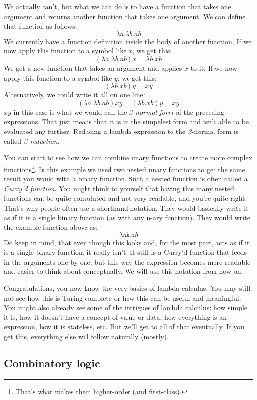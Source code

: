 \documentclass[11pt]{article}
\begin{document}
We actually can't, but what we can do is to have a function that takes one
argument and returns another function that takes one argument. We can define
that function as follows:
\[\lambda a.\lambda b.ab\]
We currently have a function definition inside the body of another function. If
we now apply this function to a symbol like \(x\), we get this:
\[(\lambda a.\lambda b.ab)x=\lambda b.xb\]
We get a new function that takes an argument and applies \(x\) to it. If we now
apply this function to a symbol like \(y\), we get this:
\[(\lambda b.xb)y=xy\]
Alternatively, we could write it all on one line:
\[(\lambda a.\lambda b.ab)xy=(\lambda b.xb)y=xy\]
\(xy\) in this case is what we would call the \emph{\(\beta\)-normal form} of
the preceding expressions. That just means that it is in the simpelest form and
isn't able to be evaluated any further. Reducing a lambda expression to the
\(\beta\)-normal form is called \emph{\(\beta\)-reduction}.

You can start to see how we can combine unary functions to create more complex
functions\footnote{That's what makes them higher-order (and first-class).}. In
this example we used two nested unary functions to get the same result you
would with a binary function. Such a nested function is often called a
\emph{Curry'd function}.
You might think to yourself that having this many nested functions can be quite
convoluted and not very readable, and you're quite right. That's why people
often use a shorthand notation. They would basically write it as if it is a
single binary function (as with any n-ary function). They would write the
example function above as:
\[\lambda ab.ab\]
Do keep in mind, that even though this looks and, for the most part, acts as if
it is a single binary function, it really isn't. It still is a Curry'd function
that feeds in the arguments one by one, but this way the expression becomes
more readable and easier to think about conceptually. We will use this notation
from now on.

Congratulations, you now know the very basics of lambda calculus. You may still
not see how this is Turing complete or how this can be useful and meaningful.
You might also already see some of the intrigues of lambda calculus; how simple
it is, how it doesn't have a concept of value or data, how everything is an
expression, how it is stateless, etc. But we'll get to all of that eventually.
If you get this, everything else will follow naturally (mostly).

\subsection{Combinatory logic}\label{combinatorylogic}
\end{document}
